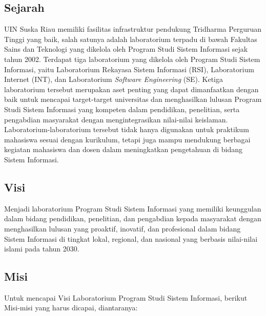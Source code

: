\subsection{Sejarah}
UIN Suska Riau memiliki fasilitas infrastruktur pendukung Tridharma Perguruan Tinggi yang baik, salah satunya adalah laboratorium terpadu di bawah Fakultas Sains dan Teknologi yang dikelola oleh Program Studi Sistem Informasi sejak tahun 2002. Terdapat tiga laboratorium yang dikelola oleh Program Studi Sistem Informasi, yaitu Laboratorium Rekayasa Sistem Informasi (RSI), Laboratorium Internet (INT), dan Laboratorium \textit{Software Engineering} (SE). Ketiga laboratorium tersebut merupakan aset penting yang dapat dimanfaatkan dengan baik untuk mencapai target-target universitas dan menghasilkan lulusan Program Studi Sistem Informasi yang kompeten dalam pendidikan, penelitian, serta pengabdian masyarakat dengan mengintegrasikan nilai-nilai keislaman. Laboratorium-laboratorium tersebut tidak hanya digunakan untuk praktikum mahasiswa sesuai dengan kurikulum, tetapi juga mampu mendukung berbagai kegiatan mahasiswa dan dosen dalam meningkatkan pengetahuan di bidang Sistem Informasi.
\subsection{Visi}
Menjadi laboratorium Program Studi Sistem Informasi yang memiliki keunggulan dalam bidang pendidikan, penelitian, dan pengabdian kepada masyarakat dengan menghasilkan lulusan yang proaktif, inovatif, dan profesional dalam bidang Sistem Informasi di tingkat lokal, regional, dan nasional yang berbasis nilai-nilai islami pada tahun 2030.
\subsection{Misi}
Untuk mencapai Visi Laboratorium Program Studi Sistem Informasi, berikut Misi-misi yang harus dicapai, diantaranya:

